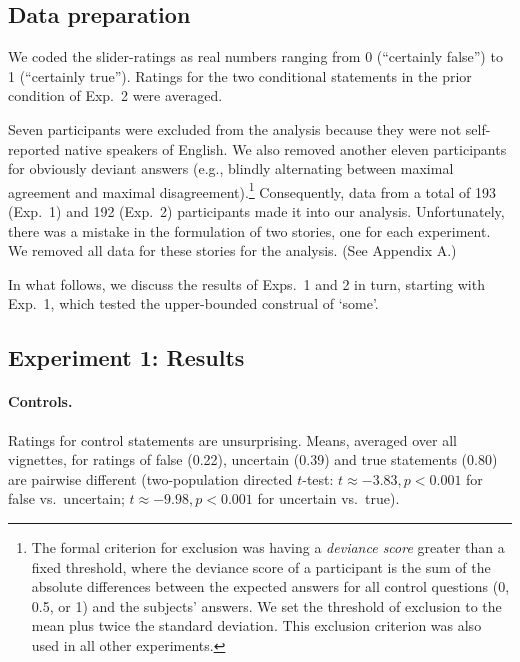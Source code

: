\documentclass[12pt]{article}
\begin{document}
\subsection{Data preparation} 

We coded the slider-ratings as real numbers ranging from 0
(``certainly false'') to 1 (``certainly true''). Ratings for the two conditional statements in the prior condition of Exp.\ 2 were averaged.

Seven participants were excluded from the analysis because they were not self-reported native speakers of English. We also removed another eleven participants for obviously deviant answers (e.g., blindly alternating between maximal agreement and maximal disagreement).\footnote{The
  formal criterion for exclusion was having a \emph{deviance score} greater than a fixed
  threshold, where the deviance score of a participant is the sum of the absolute differences
  between the expected answers for all control questions (0, 0.5, or 1) and the subjects'
  answers. %
  We set the threshold of exclusion to the mean plus twice the standard deviation. This
  exclusion criterion was also used in all other experiments.}  Consequently, data from a total
of 193 (Exp.\ 1) and 192 (Exp.\ 2) participants made it into our analysis. Unfortunately, there
was a mistake in the formulation of two stories, one for each experiment. We removed all data for these stories for the analysis. (See Appendix A.)

In what follows, we discuss the results of Exps.\ 1 and 2 in turn, starting with Exp.\ 1, which tested the upper-bounded construal of `some'.

\subsection*{Experiment 1: Results}

\paragraph{Controls.} Ratings for control statements are unsurprising. Means, averaged over all
vignettes, for ratings of false (0.22), uncertain (0.39) and true statements (0.80) are
pairwise different (two-population directed $t$-test: $t \approx - 3.83, p < 0.001$ for false
vs.~uncertain; $t \approx - 9.98, p < 0.001$ for uncertain vs.~true).
\end{document}
